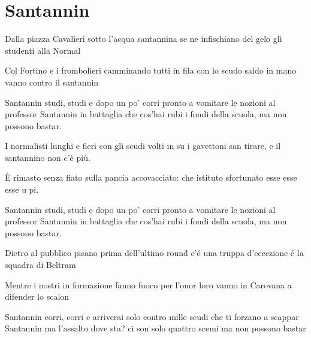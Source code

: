 \section{Santannin}
\subtitle{Sulla melodia di “Popoff“}
\begin{canzone}
Dalla piazza Cavalieri
sotto l'acqua santannina
se ne infischiano del gelo
gli studenti alla Normal

Col Fortino e i frombolieri
camminando tutti in fila
con lo scudo saldo in mano
vanno contro il santannin

Santannin
studi, studi e dopo un po'
corri pronto a vomitare
le nozioni al professor
Santannin
in battaglia che cos’hai
rubi i fondi della scuola,
ma non possono bastar.

I normalisti lunghi e fieri
con gli scudi volti in su
i gavettoni san tirare,
e il santannino non c’è più.

È rimasto senza fiato
sulla pancia accovacciato:
che istituto sfortunato
esse esse esse u pi.

Santannin
studi, studi e dopo un po'
corri pronto a vomitare
le nozioni al professor
Santannin
in battaglia che cos’hai
rubi i fondi della scuola,
ma non possono bastar.

Dietro al pubblico pisano
prima dell'ultimo round
c'é una truppa d'eccezione
é la squadra di Beltram

Mentre i nostri in formazione
fanno fuoco per l'onor
loro vanno in Carovana
a difender lo scalon

Santannin
corri, corri e arriverai
solo contro mille scudi
che ti forzano a scappar
Santannin
ma l'assalto dove sta?
ci son solo quattro scemi
ma non possono bastar
\end{canzone}
